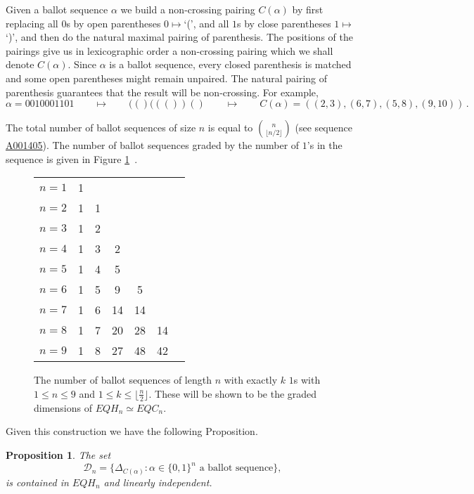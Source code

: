 \documentclass[11pt]{amsart}
\newtheorem{prop}[theorem]{Proposition}
\theoremstyle{definition}
\numberwithin{equation}{section}
\begin{document}
Given a ballot sequence $\alpha$ we build a non-crossing pairing $C(\alpha)$ by first replacing all $0$s
by open parentheses $0\mapsto$`(',
and all $1$s by close parentheses $1\mapsto$`)',
and then do the natural maximal pairing of parenthesis. The positions of the pairings
give us in lexicographic order a non-crossing pairing which we shall denote $C(\alpha)$.
Since $\alpha$ is a ballot sequence, every closed parenthesis is matched
and some open parentheses might remain unpaired.
The natural pairing of parenthesis guarantees that the result will be non-crossing. For example,
\[
\alpha=0010001101 \qquad\mapsto\qquad (()((())() \qquad\mapsto\qquad C(\alpha)=((2,3),(6,7),(5,8),(9,10)) \,.
\]

The total number of ballot sequences of size $n$ is equal to $\binom{n}{\lfloor{n/2}\rfloor}$
(see \cite{OEIS} sequence \href{https://oeis.org/A001405}{A001405}).
The number of ballot sequences graded by the number of $1$'s in the sequence
is given in Figure \ref{table:ballotseq}~.

\begin{figure}[h]
\begin{tabular}{c||cccccc}
$n=1$&1&&&&\\
$n=2$&1&1&&&\\
$n=3$&1&2&&&\\
$n=4$&1&3&2&&\\
$n=5$&1&4&5&&\\
$n=6$&1&5&9&5&\\
$n=7$&1&6&14&14&\\
$n=8$&1&7&20&28&14\\
$n=9$&1&8&27&48&42\\
\end{tabular}
\caption{The number of ballot sequences of length $n$ with exactly $k$ $1$s
with $1 \leq n \leq 9$ and $1 \leq k \leq \lfloor \frac{n}{2} \rfloor$.
These will be shown to be the graded dimensions of $EQH_n \simeq EQC_n$.}
\label{table:ballotseq}
\end{figure}

Given this construction we have the following Proposition.

\begin{prop}\label{prop:harmbasis}
The set
$${\mathcal D}_n =\big\{ \Delta_{C(\alpha)}:  \alpha \in \{0, 1\}^n \text{ a ballot sequence}\big\},
$$
is contained in $EQH_n$ and linearly independent.
\end{prop}
\end{document}
